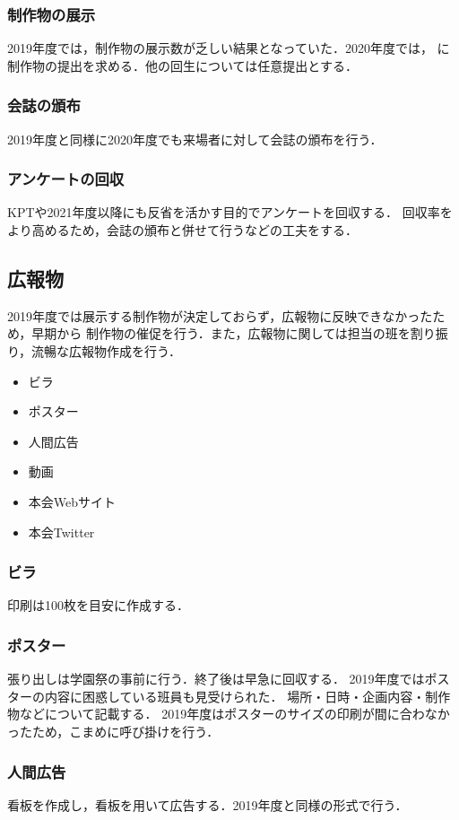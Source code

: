 \subsubsection*{制作物の展示}
2019年度では，制作物の展示数が乏しい結果となっていた．2020年度では，\secondGrade{}
に制作物の提出を求める．他の回生については任意提出とする．

\subsubsection*{会誌の頒布}
2019年度と同様に2020年度でも来場者に対して会誌の頒布を行う．

\subsubsection*{アンケートの回収}
KPTや2021年度以降にも反省を活かす目的でアンケートを回収する．
回収率をより高めるため，会誌の頒布と併せて行うなどの工夫をする．

\subsection*{広報物}
2019年度では展示する制作物が決定しておらず，広報物に反映できなかったため，早期から
制作物の催促を行う．また，広報物に関しては担当の班を割り振り，流暢な広報物作成を行う．
\begin{itemize}
    \item ビラ
    \item ポスター
    \item 人間広告
    \item 動画
    \item 本会Webサイト
    \item 本会Twitter
\end{itemize}
\subsubsection*{ビラ}
印刷は100枚を目安に作成する．

\subsubsection*{ポスター}
張り出しは学園祭の事前に行う．終了後は早急に回収する．
2019年度ではポスターの内容に困惑している班員も見受けられた．
場所・日時・企画内容・制作物などについて記載する．
2019年度はポスターのサイズの印刷が間に合わなかったため，こまめに呼び掛けを行う．

\subsubsection*{人間広告}
看板を作成し，看板を用いて広告する．2019年度と同様の形式で行う．

